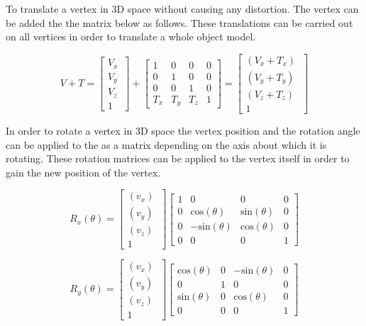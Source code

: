 To translate a vertex in 3D space without causing any distortion. The vertex can be added the the matrix below as follows. These translations can be carried out on all vertices in order to translate a whole object model. 

\begin{equation}
V + T = \begin{bmatrix}
V_{x} \\
V_{y} \\
V_{z}~ \\
1
\end{bmatrix}
+
\begin{bmatrix}
1 & 0 & 0 & 0\\
0 & 1 & 0 & 0\\
0 & 0 & 1 & 0\\
T_{x} & T_{y} & T_{z} & 1
\end{bmatrix}
= \begin{bmatrix}
(V_x + T_x)~ \\
(V_y + T_y)~ \\
(V_z + T_z)~ \\
1
\end{bmatrix}
\end{equation}

\noindent

In order to rotate a vertex in 3D space the vertex position and the rotation angle can be applied to the as a matrix depending on the axis about which it is rotating. These rotation matrices can be applied to the vertex itself in order to gain the new position of the vertex. 

\begin{equation}
R_x(\theta) = 
\begin{bmatrix}
(v_x)~ \\
(v_y)~ \\ 
(v_z)~ \\
1
\end{bmatrix}
\begin{bmatrix}
1 	& 0 					& 0 					& 0\\
0 	& \text{cos}(\theta) 	& \text{sin}(\theta) 	& 0\\
0 	& -\text{sin}(\theta) 	& \text{cos}(\theta) 	& 0\\
0 	& 0 					& 0 					& 1
\end{bmatrix}
\end{equation}

\begin{equation}
R_y(\theta) = 
\begin{bmatrix}
(v_x)~ \\
(v_y)~ \\
(v_z)~ \\
1
\end{bmatrix}
\begin{bmatrix}
\text{cos}(\theta) 	& 0 					& -\text{sin}(\theta) 	& 0\\
0 					& 1						& 0						& 0\\
\text{sin}(\theta) 	& 0 					& \text{cos}(\theta)	& 0\\
0 					& 0 					& 0 					& 1
\end{bmatrix}
\end{equation}

